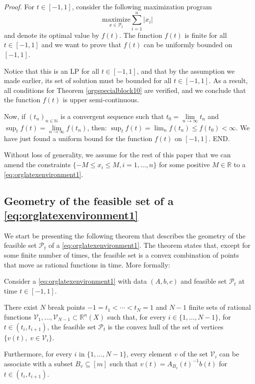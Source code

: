 \documentclass[moor]{informs1}
\renewenvironment{proof}{\emph{Proof.}}{END.}
\begin{document}
\begin{proof}
For \(t \in [-1, 1]\), consider the following maximization program $$\underset{x \in \mathcal P_t}{\text{maximize}} \sum_{i=1}^n |x_i|$$ and denote its optimal value by \(f(t)\). The function \(f(t)\) is finite for all \(t \in [-1, 1]\) and we want to prove that \(f(t)\) can be uniformly bounded on \([-1, 1]\).

Notice that this is an LP for all \(t \in [-1,1]\), and that by the assumption we made earlier, its set of solution must be bounded for all \(t \in [-1, 1]\). As a result, all conditions for Theorem \ref{orgspecialblock10} are verified, and we conclude that  the function \(f(t)\) is upper semi-continuous.

Now, if \((t_n)_{n \in \mathbb N}\) is a convergent sequence such that \(t_0 = \underset{n \rightarrow \infty}{\lim} t_n\) and \(\sup_t f(t) =  \underset{n \rightarrow \infty}{\lim} f(t_n)\), then: \(\sup_t f(t) = \lim_n f(t_n) \le f(t_0) < \infty\). We have just found a uniform bound for the function \(f(t)\) on \([-1, 1]\).
\end{proof}

Without loss of generality, we assume for the rest of this paper that we can amend the constraints \(\{-M \le x_i \le M, i=1, \ldots, n\}\) for some positive \(M \in \mathbb R\) to a \ref{eq:orglatexenvironment1}.
\newpage


\subsection{Geometry of the feasible set of a \ref{eq:orglatexenvironment1}}
\label{sec:orgheadline6}

We start be presenting the following theorem that describes the geometry of the feasible set \(\mathcal P_t\) of a \ref{eq:orglatexenvironment1}. The theorem states that, except for some finite number of times, the feasible set is a convex combination of points that move as rational functions in time. More formally:

\begin{thm}
Consider a \ref{eq:orglatexenvironment1} with data \((A, b, c)\) and feasible set \(\mathcal P_t\) at time \(t \in [-1, 1]\).

There exist \(N\) break points \(-1 = t_1 < \cdots < t_N = 1\) and \(N-1\) finite sets of rational functions \(\mathcal V_1, \ldots, \mathcal V_{N-1} \subset \mathbb R^n(X)\) such that, for every \(i \in \{ 1, \ldots, N-1\}\), for \(t \in (t_i, t_{i+1})\), the feasible set \(\mathcal P_t\) is the convex hull of the set of vertices \(\{v(t), \; v \in \mathcal V_i\}\).

Furthermore, for every \(i\) in \(\{ 1, \ldots, N-1\}\), every element \(v\) of the set \(\mathcal V_i\) can be associate with a subset \(B_v \subseteq [m]\) such that \(v(t) = A_{B_v}(t)^{-1}b(t)\) for  \(t \in (t_i, t_{i+1})\).
\label{orgspecialblock3}

\end{thm}
\end{document}
